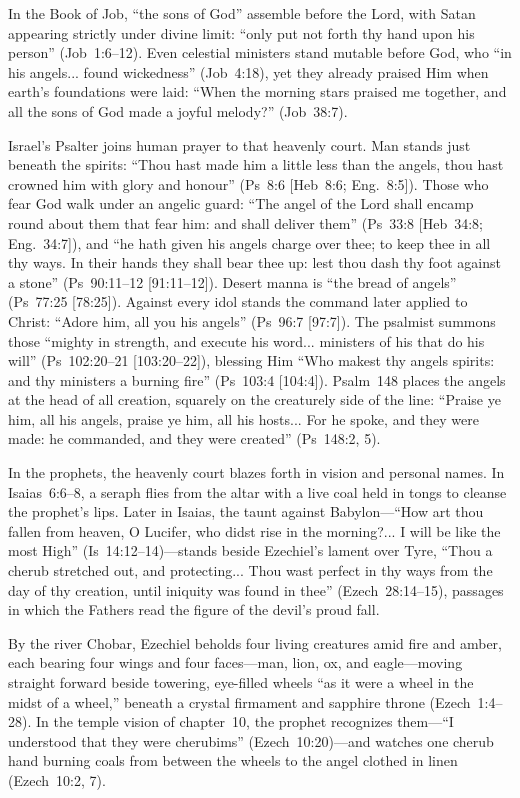 In the Book of Job, ``the sons of God'' assemble before the Lord, with Satan appearing strictly under divine limit: ``only put not forth thy hand upon his person'' (Job~1:6--12). Even celestial ministers stand mutable before God, who ``in his angels... found wickedness'' (Job~4:18), yet they already praised Him when earth's foundations were laid: ``When the morning stars praised me together, and all the sons of God made a joyful melody?'' (Job~38:7).

Israel's Psalter joins human prayer to that heavenly court. Man stands just beneath the spirits: ``Thou hast made him a little less than the angels, thou hast crowned him with glory and honour'' (Ps~8:6 [Heb~8:6; Eng.~8:5]). Those who fear God walk under an angelic guard: ``The angel of the Lord shall encamp round about them that fear him: and shall deliver them'' (Ps~33:8 [Heb~34:8; Eng.~34:7]), and ``he hath given his angels charge over thee; to keep thee in all thy ways. In their hands they shall bear thee up: lest thou dash thy foot against a stone'' (Ps~90:11--12 [91:11--12]). Desert manna is ``the bread of angels'' (Ps~77:25 [78:25]). Against every idol stands the command later applied to Christ: ``Adore him, all you his angels'' (Ps~96:7 [97:7]). The psalmist summons those ``mighty in strength, and execute his word... ministers of his that do his will'' (Ps~102:20--21 [103:20--22]), blessing Him ``Who makest thy angels spirits: and thy ministers a burning fire'' (Ps~103:4 [104:4]). Psalm~148 places the angels at the head of all creation, squarely on the creaturely side of the line: ``Praise ye him, all his angels, praise ye him, all his hosts... For he spoke, and they were made: he commanded, and they were created'' (Ps~148:2, 5).

In the prophets, the heavenly court blazes forth in vision and personal names. In Isaias~6:6--8, a seraph flies from the altar with a live coal held in tongs to cleanse the prophet's lips. Later in Isaias, the taunt against Babylon---``How art thou fallen from heaven, O Lucifer, who didst rise in the morning?... I will be like the most High'' (Is~14:12--14)---stands beside Ezechiel's lament over Tyre, ``Thou a cherub stretched out, and protecting... Thou wast perfect in thy ways from the day of thy creation, until iniquity was found in thee'' (Ezech~28:14--15), passages in which the Fathers read the figure of the devil's proud fall.

By the river Chobar, Ezechiel beholds four living creatures amid fire and amber, each bearing four wings and four faces---man, lion, ox, and eagle---moving straight forward beside towering, eye-filled wheels ``as it were a wheel in the midst of a wheel,'' beneath a crystal firmament and sapphire throne (Ezech~1:4--28). In the temple vision of chapter~10, the prophet recognizes them---``I understood that they were cherubims'' (Ezech~10:20)---and watches one cherub hand burning coals from between the wheels to the angel clothed in linen (Ezech~10:2, 7).


